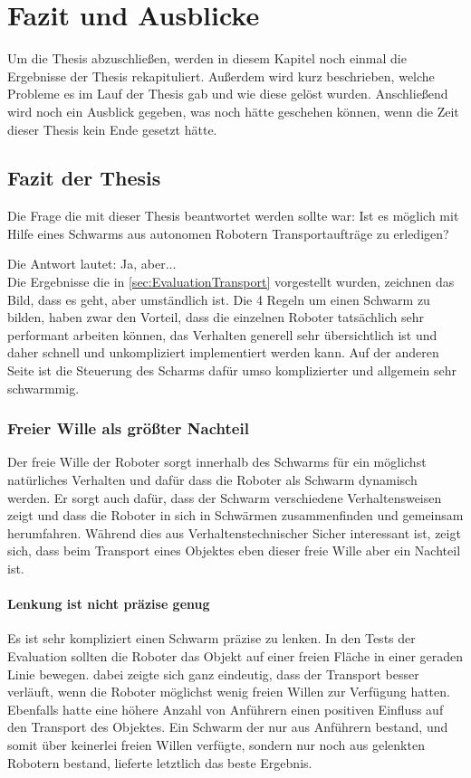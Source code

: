 \chapter{Fazit und Ausblicke}

Um die Thesis abzuschließen, werden in diesem Kapitel noch einmal die Ergebnisse der Thesis rekapituliert. Außerdem wird kurz beschrieben, welche Probleme es im Lauf der Thesis gab und wie diese gelöst wurden. Anschließend wird noch ein Ausblick gegeben, was noch hätte geschehen können, wenn die Zeit dieser Thesis kein Ende gesetzt hätte.

\section{Fazit der Thesis}

Die Frage die mit dieser Thesis beantwortet werden sollte war: Ist es möglich mit Hilfe eines Schwarms aus autonomen Robotern Transportaufträge zu erledigen?

Die Antwort lautet: Ja, aber...\\

Die Ergebnisse die in \autoref{sec:EvaluationTransport} vorgestellt wurden, zeichnen das Bild, dass es geht, aber umständlich ist. Die 4 Regeln um einen Schwarm zu bilden, haben zwar den Vorteil, dass die einzelnen Roboter tatsächlich sehr performant arbeiten können, das Verhalten generell sehr übersichtlich ist und daher schnell und unkompliziert implementiert werden kann. Auf der anderen Seite ist die Steuerung des Scharms dafür umso komplizierter und allgemein sehr schwarmmig.

\subsection*{Freier Wille als größter Nachteil}
Der freie Wille der Roboter sorgt innerhalb des Schwarms für ein möglichst natürliches Verhalten und dafür dass die Roboter als Schwarm dynamisch werden. Er sorgt auch dafür, dass der Schwarm verschiedene Verhaltensweisen zeigt und dass die Roboter in sich in Schwärmen zusammenfinden und gemeinsam herumfahren. Während dies aus Verhaltenstechnischer Sicher interessant ist, zeigt sich, dass beim Transport eines Objektes eben dieser freie Wille aber ein Nachteil ist.

\subsubsection*{Lenkung ist nicht präzise genug}
Es ist sehr kompliziert einen Schwarm präzise zu lenken. In den Tests der Evaluation sollten die Roboter das Objekt auf einer freien Fläche in einer geraden Linie bewegen. dabei zeigte sich ganz eindeutig, dass der Transport besser verläuft, wenn die Roboter möglichst wenig freien Willen zur Verfügung hatten. Ebenfalls hatte eine höhere Anzahl von Anführern einen positiven Einfluss auf den Transport des Objektes. Ein Schwarm der nur aus Anführern bestand, und somit über keinerlei freien Willen verfügte, sondern nur noch aus gelenkten Robotern bestand, lieferte letztlich das beste Ergebnis.

